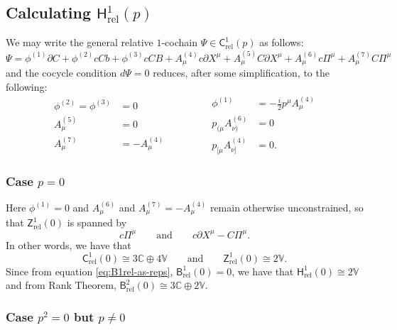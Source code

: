 \documentclass[11pt,reqno,a4paper,final]{amsart}
\theoremstyle{plain}
\theoremstyle{definition}
\renewcommand{\d}{\partial}
\newcommand{\Crel}{\mathsf{C}_{\mathrm{rel}}} %
\newcommand{\Hrel}{\mathsf{H}_{\mathrm{rel}}}
\newcommand{\Brel}{\mathsf{B}_{\mathrm{rel}}}
\newcommand{\Zrel}{\mathsf{Z}_{\mathrm{rel}}}
\newcommand{\VV}{\mathbb{V}}
\newcommand{\CC}{\mathbb{C}}
\newcommand{\1}{\mathbb{1}}
\numberwithin{equation}{section}
\begin{document}
\subsection{Calculating $\Hrel^1(p)$}
\label{sec:calculating-hrel1p}

We may write the general relative $1$-cochain $\Psi \in \Crel^1(p)$ as follows:
\begin{equation}
  \Psi = \phi^{(1)} \d C + \phi^{(2)} c C b + \phi^{(3)} c C B + A^{(4)}_\mu c \d X^\mu + A^{(5)}_\mu C \d X^\mu + A^{(6)}_\mu c \Pi^\mu + A^{(7)}_\mu C \Pi^\mu
\end{equation}
and the cocycle condition $d\Psi = 0$ reduces, after some simplification, to the following:
\begin{equation}
  \begin{aligned}
    \phi^{(2)} = \phi^{(3)} &=0\\
    A^{(5)}_\mu &= 0\\
    A^{(7)}_\mu &= - A^{(4)}_\mu
  \end{aligned}
  \qquad\qquad
  \begin{aligned}
    \phi^{(1)} &= - \tfrac{i}2 p^\mu A^{(4)}_\mu\\
    p_{(\mu} A^{(6)}_{\nu)} &= 0\\
    p_{[\mu} A^{(4)}_{\nu]} &= 0.
  \end{aligned}
\end{equation}

\subsubsection{Case $p=0$}
\label{sec:h1-p=0}

Here $\phi^{(1)} =0$ and $A_\mu^{(6)}$ and $A_\mu^{(7)} = -
A_\mu^{(4)}$ remain otherwise unconstrained, so that $\Zrel^1(0)$ is
spanned by
\begin{equation}\label{eq:Zrel10}
  c \Pi^\mu \qquad\text{and}\qquad c \d X^\mu - C \Pi^\mu.
\end{equation}
In other words, we have that
\begin{equation}
  \Crel^1(0) \cong 3 \CC \oplus 4 \VV  \qquad\text{and}\qquad \Zrel^1(0)
  \cong 2 \VV.
\end{equation}
Since from equation \eqref{eq:B1rel-as-reps}, $\Brel^1(0)=0$, we have
that $\Hrel^1(0) \cong 2 \VV$ and from Rank Theorem, $\Brel^2(0)\cong 3
\CC \oplus 2 \VV$.

\subsubsection{Case $p^2 = 0$ but $p\neq 0$}
\label{sec:h1-p2=0}
\end{document}
